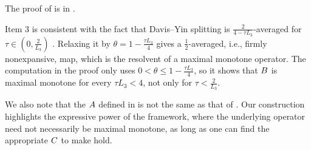 \documentclass[11pt]{article}
\begin{document}
The proof of  is in .


\begin{remark}
    Item 3 is consistent with the fact that Davis--Yin splitting is $\frac{2}{4-\tau L_3}$-averaged for $\tau\in(0,\frac{2}{L_3})$ \citep[Proposition~2.1]{davisThreeOperatorSplittingScheme2017}.
    Relaxing it by $\theta = 1 - \frac{\tau L_3}{4}$ gives a $\frac{1}{2}$-averaged, i.e., firmly nonexpansive, map, which is the resolvent of a maximal monotone operator.
    The computation in the proof only uses $0<\theta\leq1-\frac{\tau L_3}{4}$, so it shows that ${B}$ is maximal monotone for every $\tau L_3<4$, not only for $\tau<\frac{2}{L_3}$.
\end{remark}
\begin{remark}
    We also note that the ${A}$ defined in  is not the same as that of \citet[Section 3.3]{alves2025generalframeworkinexactsplitting}.
    Our construction highlights the expressive power of the framework, where the underlying operator need not necessarily be maximal monotone, as long as one can find the appropriate ${C}$ to make  hold.
\end{remark}
\end{document}
